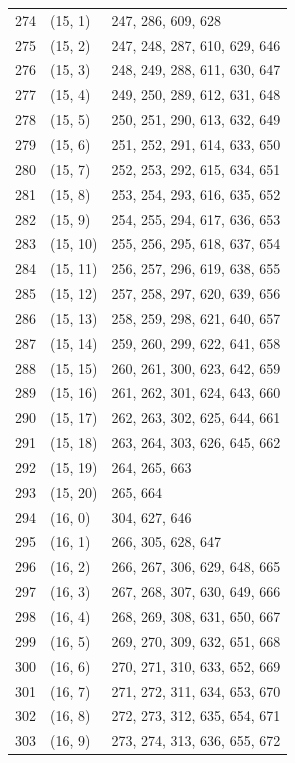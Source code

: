 \documentclass{article}
\begin{document}
\begin{longtable}{lll}
  274 & (15, 1) & 247, 286, 609, 628 \\
  275 & (15, 2) & 247, 248, 287, 610, 629, 646 \\
  276 & (15, 3) & 248, 249, 288, 611, 630, 647 \\
  277 & (15, 4) & 249, 250, 289, 612, 631, 648 \\
  278 & (15, 5) & 250, 251, 290, 613, 632, 649 \\
  279 & (15, 6) & 251, 252, 291, 614, 633, 650 \\
  280 & (15, 7) & 252, 253, 292, 615, 634, 651 \\
  281 & (15, 8) & 253, 254, 293, 616, 635, 652 \\
  282 & (15, 9) & 254, 255, 294, 617, 636, 653 \\
  283 & (15, 10) & 255, 256, 295, 618, 637, 654 \\
  284 & (15, 11) & 256, 257, 296, 619, 638, 655 \\
  285 & (15, 12) & 257, 258, 297, 620, 639, 656 \\
  286 & (15, 13) & 258, 259, 298, 621, 640, 657 \\
  287 & (15, 14) & 259, 260, 299, 622, 641, 658 \\
  288 & (15, 15) & 260, 261, 300, 623, 642, 659 \\
  289 & (15, 16) & 261, 262, 301, 624, 643, 660 \\
  290 & (15, 17) & 262, 263, 302, 625, 644, 661 \\
  291 & (15, 18) & 263, 264, 303, 626, 645, 662 \\
  292 & (15, 19) & 264, 265, 663 \\
  293 & (15, 20) & 265, 664 \\
  294 & (16, 0) & 304, 627, 646 \\
  295 & (16, 1) & 266, 305, 628, 647 \\
  296 & (16, 2) & 266, 267, 306, 629, 648, 665 \\
  297 & (16, 3) & 267, 268, 307, 630, 649, 666 \\
  298 & (16, 4) & 268, 269, 308, 631, 650, 667 \\
  299 & (16, 5) & 269, 270, 309, 632, 651, 668 \\
  300 & (16, 6) & 270, 271, 310, 633, 652, 669 \\
  301 & (16, 7) & 271, 272, 311, 634, 653, 670 \\
  302 & (16, 8) & 272, 273, 312, 635, 654, 671 \\
  303 & (16, 9) & 273, 274, 313, 636, 655, 672 \\

\end{longtable}
\end{document}
